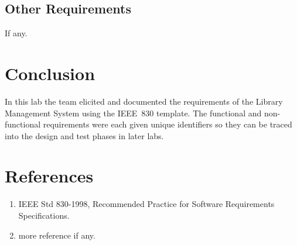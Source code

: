 \documentclass[11pt,a4paper]{article}
\newcommand{\projecttitle}{Library Management System}   %
\begin{document}
\subsection{Other Requirements}
If any.

\section{Conclusion}
In this lab the team elicited and documented the requirements of the
\projecttitle{} using the IEEE~830 template. The functional and non-functional
requirements were each given unique identifiers so they can be traced into the
design and test phases in later labs.

\section{References}
\begin{enumerate}[leftmargin=*]
  \item IEEE Std 830-1998, Recommended Practice for Software Requirements Specifications.
  \item more reference if any.
\end{enumerate}
\end{document}
